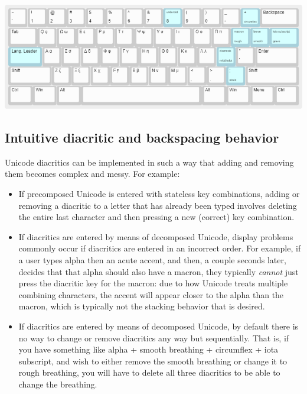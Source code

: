 \documentclass[11pt]{article}
\begin{document}
\begin{center}
\includegraphics[width=.9\linewidth]{./images/greek-layer.png}
\end{center}

\subsection{Intuitive diacritic and backspacing behavior}
\label{sec:org02ee40c}

Unicode diacritics can be implemented in such a way that adding and removing them becomes complex and messy. For example:

\begin{itemize}
\item If precomposed Unicode is entered with stateless key combinations, adding or removing a diacritic to a letter that has already been typed involves deleting the entire last character and then pressing a new (correct) key combination.
\item If diacritics are entered by means of decomposed Unicode, display problems commonly occur if diacritics are entered in an incorrect order. For example, if a user types alpha then an acute accent, and then, a couple seconds later, decides that that alpha should also have a macron, they typically \emph{cannot} just press the diacritic key for the macron: due to how Unicode treats multiple combining characters, the accent will appear closer to the alpha than the macron, which is typically not the stacking behavior that is desired.
\item If diacritics are entered by means of decomposed Unicode, by default there is no way to change or remove diacritics any way but sequentially. That is, if you have something like alpha + smooth breathing + circumflex + iota subscript, and wish to either remove the smooth breathing or change it to rough breathing, you will have to delete all three diacritics to be able to change the breathing.
\end{itemize}
\end{document}
